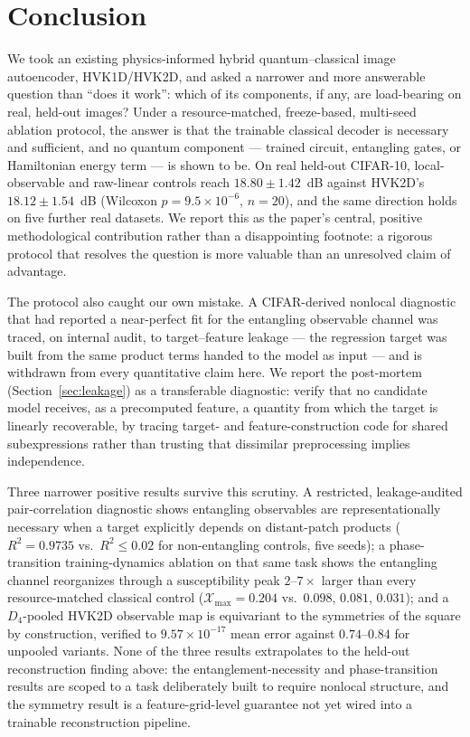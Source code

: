 \documentclass[journal]{IEEEtran}
\begin{document}
\section{Conclusion}
We took an existing physics-informed hybrid quantum--classical image autoencoder, HVK1D/HVK2D, and asked a narrower and more answerable question than ``does it work'': which of its components, if any, are load-bearing on real, held-out images? Under a resource-matched, freeze-based, multi-seed ablation protocol, the answer is that the trainable classical decoder is necessary and sufficient, and no quantum component --- trained circuit, entangling gates, or Hamiltonian energy term --- is shown to be. On real held-out CIFAR-10, local-observable and raw-linear controls reach $18.80\pm1.42$~dB against HVK2D's $18.12\pm1.54$~dB (Wilcoxon $p=9.5\times10^{-6}$, $n=20$), and the same direction holds on five further real datasets. We report this as the paper's central, positive methodological contribution rather than a disappointing footnote: a rigorous protocol that resolves the question is more valuable than an unresolved claim of advantage.

The protocol also caught our own mistake. A CIFAR-derived nonlocal diagnostic that had reported a near-perfect fit for the entangling observable channel was traced, on internal audit, to target--feature leakage --- the regression target was built from the same product terms handed to the model as input --- and is withdrawn from every quantitative claim here. We report the post-mortem (Section~\ref{sec:leakage}) as a transferable diagnostic: verify that no candidate model receives, as a precomputed feature, a quantity from which the target is linearly recoverable, by tracing target- and feature-construction code for shared subexpressions rather than trusting that dissimilar preprocessing implies independence.

Three narrower positive results survive this scrutiny. A restricted, leakage-audited pair-correlation diagnostic shows entangling observables are representationally necessary when a target explicitly depends on distant-patch products ($R^2=0.9735$ vs.\ $R^2\leq0.02$ for non-entangling controls, five seeds); a phase-transition training-dynamics ablation on that same task shows the entangling channel reorganizes through a susceptibility peak $2$--$7\times$ larger than every resource-matched classical control ($\mathcal{X}_{\max}=0.204$ vs.\ $0.098$, $0.081$, $0.031$); and a $D_4$-pooled HVK2D observable map is equivariant to the symmetries of the square by construction, verified to $9.57\times10^{-17}$ mean error against $0.74$--$0.84$ for unpooled variants. None of the three results extrapolates to the held-out reconstruction finding above: the entanglement-necessity and phase-transition results are scoped to a task deliberately built to require nonlocal structure, and the symmetry result is a feature-grid-level guarantee not yet wired into a trainable reconstruction pipeline.
\end{document}

